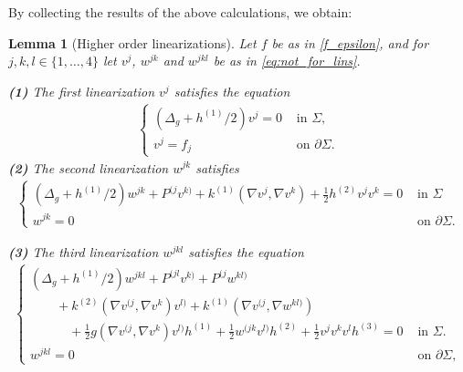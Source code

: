 \documentclass[12pt]{amsart}
\def\p{\partial}
\newtheorem{lemma}[theorem]{Lemma}
\theoremstyle{definition}
\theoremstyle{remark}
\newcommand{\eps}{\epsilon}
\begin{document}
By collecting the results of the above calculations, we obtain:
\begin{lemma}[Higher order linearizations]\label{lem:high_ord_lin} Let $f$ be as in \eqref{f_epsilon}, and for $j,k,l\in \{1,\ldots,4\}$ let $v^{j}$, $w^{jk}$ and $w^{jkl}$ be as in \eqref{eq:not_for_lins}.

 \noindent\textbf{(1)} The first linearization $v^{j}$ %
 satisfies the equation 
 \begin{equation}\label{linear_eq}
	\begin{aligned}
		\begin{cases}
			(\Delta_g+h^{(1)}/2)v^j=0 
			& \text{ in } \Sigma,
			\\
			v^{j}=f_j
			&\text{ on }\p \Sigma.
		\end{cases}
	\end{aligned}
\end{equation}
 \noindent\textbf{(2)} The second linearization $w^{jk}$ %
 satisfies %
 \begin{equation}\label{2nd_lin_eq}
 \begin{aligned}
		\begin{cases}
  (\Delta_g+h^{(1)}/2)w^{jk}+P^{(j}v^{k)}+k^{(1)}(\nabla v^{j},\nabla v^{k})+\frac{1}{2}h^{(2)}v^{j}v^{k}= 0& \text{ in } \Sigma \\
  w^{jk}=0
			&\text{ on }\p \Sigma.
  		\end{cases}
	\end{aligned}
 \end{equation}

 \noindent\textbf{(3)} The third linearization $w^{jkl}$ %
 satisfies the equation
  \begin{equation}\label{3rd_lin_eq}
	\begin{aligned}
		\begin{cases}
			(\Delta_g+h^{(1)}/2)w^{jkl}+P^{(jl}v^{k)}+P^{(j}w^{kl)} \\
	\qquad	+k^{(2)}(\nabla v^{(j},\nabla v^{k})v^{l)}+k^{(1)}(\nabla v^{(j},\nabla w^{kl)}) \\
  \qquad\quad+\frac{1}{2}g(\nabla v^{(j},\nabla v^{k})v^{l)}h^{(1)} +\frac{1}{2}w^{(jk}v^{l)}h^{(2)}+\frac{1}{2}v^{j}v^{k}v^{l}h^{(3)}=0 
			& \text{ in } \Sigma. \\
			w^{jkl}=0
			&\text{ on }\p \Sigma,
		\end{cases}
	\end{aligned}
\end{equation}
\end{lemma}
\end{document}
